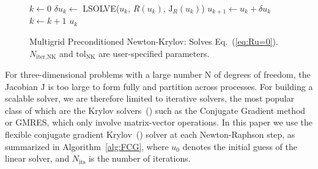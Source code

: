 %
\begin{figure}
\begin{algorithm}[H]
  \caption{\label{alg:newtonraphson}
    Multigrid Preconditioned Newton-Krylov: Solves Eq.~(\ref{eq:Ru=0}).$N_{\text{iter,NK}}$ and $\text{tol}_{\text{NK}}$ are user-specified parameters.
 }
    \begin{algorithmic}[1]
      \State $k \leftarrow 0$
       \State  $\delta u_k\leftarrow $ LSOLVE($u_k$, $R(u_k)$, $\mathrm{J}_R(u_k)$) 
       \State $u_{k+1} \leftarrow u_k + \delta u_k$
       \State $k \leftarrow k + 1$
       \EndWhile
       \State \Return $u_{k}$
      \EndProcedure 
    \end{algorithmic}
\end{algorithm}
\end{figure}

For three-dimensional problems with a large number $\mathrm{N}$ of
degrees of freedom, the Jacobian $\mathrm{J}$ is too large to form fully and partition across processes. For
building a scalable solver, we are therefore limited to iterative
solvers, the most popular class of which are the Krylov
solvers~(\citet*{saad2003iterative}) such as the Conjugate Gradient method or GMRES,
which only involve matrix-vector operations. In this paper we use the
flexible conjugate gradient Krylov~(\citet*{notay2000flexible}) solver at each
Newton-Raphson step, as summarized in Algorithm~\ref{alg:FCG}, where
$u_0$ denotes the initial guess of the linear solver, and
$N_{\text{its}}$ is the number of iterations.

